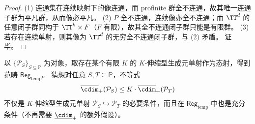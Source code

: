 \begin{proof}
(1) 连通集在连续映射下的像连通，而 profinite 群全不连通，故其唯一连通子群为平凡群，从而像必平凡。
(2) \(P\) 全不连通，连续像亦全不连通；而 \(\TT^d\) 的任意闭子群同构于 \(\TT^k\times F\)（\(F\) 有限），故其全不连通闭子群只能是有限群。
(3) 若存在连续单射，则其像为 \(\TT^d\) 的无穷全不连通闭子群，与 (2) 矛盾。
证毕。
\end{proof}

\begin{conjecture}[受控伸缩实现类中的归一化半圆维完备性]\label{conj:conclusion-prime-register-normalized-cdim-completeness}
以 \(\{\mathcal P_S\}_{S\subseteq\mathbb P}\) 为对象，取存在某个有限 \(K\) 的 \(K\)-伸缩型生成元单射作为态射，得到范畴 \(\mathsf{Reg}_{\mathrm{temp}}\)。
猜想对任意 \(S,T\subseteq\mathbb P\)，不等式
\[
\overline{\cdim}_+(\mathcal P_S)\le K\cdot \overline{\cdim}_+(\mathcal P_T)
\]
不仅是 \(K\)-伸缩型生成元单射 \(\mathcal P_S\hookrightarrow \mathcal P_T\) 的必要条件，而且在 \(\mathsf{Reg}_{\mathrm{temp}}\) 中也是充分条件（不再需要 \(\underline{\cdim}_+\) 的额外假设）。
\end{conjecture}

\endinput
